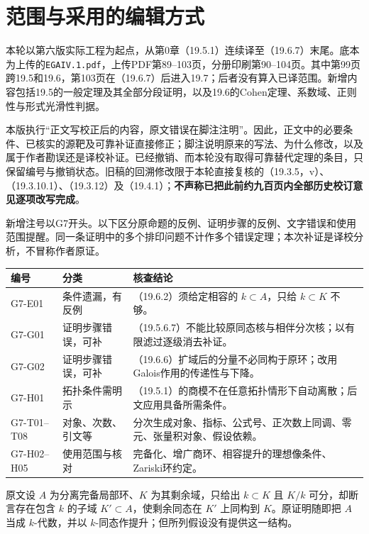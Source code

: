 \section*{范围与采用的编辑方式}
本轮以第六版实际工程为起点，从第0章（19.5.1）连续译至（19.6.7）末尾。底本为上传的\texttt{EGAIV.1.pdf}，上传PDF第89--103页，分册印刷第90--104页。其中第99页跨19.5和19.6，第103页在（19.6.7）后进入19.7；后者没有算入已译范围。新增内容包括19.5的一般定理及其全部分段证明，以及19.6的Cohen定理、系数域、正则性与形式光滑性判据。

本版执行“正文写校正后的内容，原文错误在脚注注明”。因此，正文中的必要条件、已核实的源靶及可靠补证直接修正；脚注说明原来的写法、为什么修改，以及属于作者勘误还是译校补证。已经撤销、而本轮没有取得可靠替代定理的条目，只保留编号与撤销状态。旧稿的回溯修改限于本轮直接复核的（19.3.5，v）、（19.3.10.1）、（19.3.12）及（19.4.1）；\textbf{不声称已把此前约九百页内全部历史校订意见逐项改写完成}。

新增注号以G7开头。以下区分原命题的反例、证明步骤的反例、文字错误和使用范围提醒。同一条证明中的多个排印问题不计作多个错误定理；本次补证是译校分析，不冒称作者原证。

\begin{longtable}{@{}p{.16\linewidth}p{.21\linewidth}p{.54\linewidth}@{}}
\toprule 编号 & 分类 & 核查结论\\\midrule\endhead
G7-E01 & 条件遗漏，有反例 & （19.6.2）须给定相容的 $k\subset A$，只给 $k\subset K$ 不够。\\
G7-G01 & 证明步骤错误，可补 & （19.5.6.7）不能比较原同态核与相伴分次核；以有限滤过逐级消去补证。\\
G7-G02 & 证明步骤错误，可补 & （19.6.6）扩域后的分量不必同构于原环；改用Galois作用的传递性与下降。\\
G7-H01 & 拓扑条件需明示 & （19.5.1）的商模不在任意拓扑情形下自动离散；后文应用具备所需条件。\\
G7-T01--T08 & 对象、次数、引文等 & 分次生成对象、指标、公式号、正次数上同调、零元、张量积对象、假设依赖。\\
G7-H02--H05 & 使用范围与核对 & 完备化、增广商环、相容提升的理想像条件、Zariski环约定。\\
\bottomrule
\end{longtable}

原文设 $A$ 为分离完备局部环、$K$ 为其剩余域，只给出 $k\subset K$ 且 $K/k$ 可分，却断言存在包含 $k$ 的子域 $K'\subset A$，使剩余同态在 $K'$ 上同构到 $K$。原证明随即把 $A$ 当成 $k$-代数，并以 $k$-同态作提升；但所列假设没有提供这一结构。

